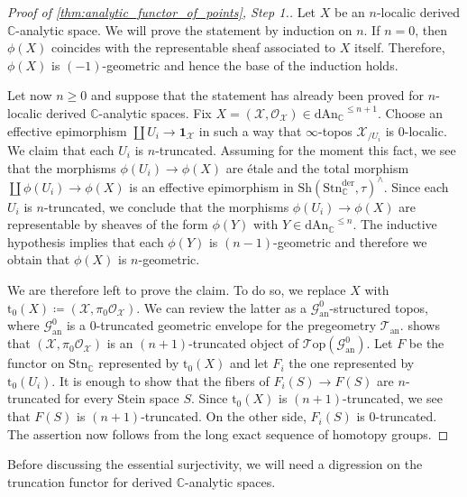 \documentclass[12pt,a4paper,reqno]{amsart}
\theoremstyle{plain}
\theoremstyle{definition}
\theoremstyle{remark}
\numberwithin{equation}{section}
\begin{document}
\begin{proof}[Proof of \cref{thm:analytic_functor_of_points}, Step 1.]
	Let $X$ be an $n$-localic derived {$\mathbb C$-analytic\xspace} space. We will prove the statement by induction on $n$.
	If $n = 0$, then $\phi(X)$ coincides with the representable sheaf associated to $X$ itself. Therefore, $\phi(X)$ is $(-1)$-geometric and hence the base of the induction holds.

	Let now $n \ge 0$ and suppose that the statement has already been proved for $n$-localic derived {$\mathbb C$-analytic\xspace} spaces.
	Fix $X = ({\mathcal X}, {\mathcal O}_{\mathcal X}) \in {\mathrm{dAn}_{\mathbb C}}^{\le n + 1}$.
	Choose an effective epimorphism $\coprod U_i \to \mathbf 1_{\mathcal X}$ in such a way that $\infty$-topos ${\mathcal X}_{/U_i}$ is $0$-localic.
	We claim that each $U_i$ is $n$-truncated.
	Assuming for the moment this fact, we see that the morphisms $\phi(U_i) \to \phi(X)$ are \'etale and the total morphism $\coprod \phi(U_i) \to \phi(X)$ is an effective epimorphism in ${\mathrm{Sh}}({\mathrm{Stn}^{\mathrm{der}}_{\mathbb C}}, \tau)^\wedge$. Since each $U_i$ is $n$-truncated, we conclude that the morphisms $\phi(U_i) \to \phi(X)$ are representable by sheaves of the form $\phi(Y)$ with $Y \in {\mathrm{dAn}_{\mathbb C}}^{\le n}$. The inductive hypothesis implies that each $\phi(Y)$ is $(n-1)$-geometric and therefore we obtain that $\phi(X)$ is $n$-geometric.
	
	We are therefore left to prove the claim. To do so, we replace $X$ with ${\mathrm{t}_0}(X) \coloneqq ({\mathcal X}, \pi_0 {\mathcal O}_{\mathcal X})$. We can review the latter as a ${\mathcal G}^0_{\mathrm{an}}$-structured topos, where ${\mathcal G}^0_{\mathrm{an}}$ is a $0$-truncated geometric envelope for the pregeometry ${{\mathcal T}_{\mathrm{an}}}$.
	\cite[Lemma 2.6.19]{DAG-V} shows that $({\mathcal X}, \pi_0 {\mathcal O}_{\mathcal X})$ is an $(n+1)$-truncated object of ${\mathcal T\mathrm{op}}({\mathcal G}^0_{\mathrm{an}})$.
	Let $F$ be the functor on $\mathrm{Stn}_{\mathbb C}$ represented by ${\mathrm{t}_0}(X)$ and let $F_i$ the one represented by ${\mathrm{t}_0}(U_i)$.
	It is enough to show that the fibers of $F_i(S) \to F(S)$ are $n$-truncated for every Stein space $S$. Since ${\mathrm{t}_0}(X)$ is $(n+1)$-truncated, we see that $F(S)$ is $(n+1)$-truncated. On the other side, $F_i(S)$ is $0$-truncated. The assertion now follows from the long exact sequence of homotopy groups.	
\end{proof}

Before discussing the essential surjectivity, we will need a digression on the truncation functor for derived {$\mathbb C$-analytic\xspace} spaces.
\end{document}
